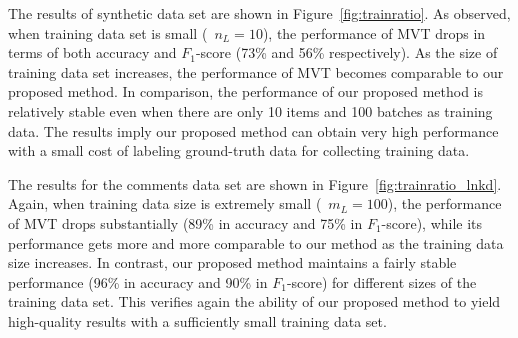 The results of synthetic data set are shown in Figure~\ref{fig:trainratio}.  
As observed, when training data set is small (\eg~$n_L=10$), 
the performance of MVT drops in terms of both accuracy and $F_1$-score (73\% and 56\% respectively).  
As the size of training data set increases, 
the performance of MVT becomes comparable to our proposed method.  
In comparison, the performance of our proposed method is relatively stable
even when there are only 10 items and 100 batches as training data.  
The results imply our proposed method can obtain very high performance 
with a small cost of labeling ground-truth data for collecting training data.  

The results for the comments data set are shown in Figure~\ref{fig:trainratio_lnkd}.  
Again, when training data size is extremely small (\eg~$m_L=100$), 
the performance of MVT drops substantially (89\% in accuracy and 75\% in $F_1$-score), 
while its performance gets more and more comparable to our method as the training data size increases.  
In contrast, our proposed method maintains a fairly stable 
performance (96\% in accuracy and 90\% in $F_1$-score) for different sizes of the training data set. 
This verifies again the ability of our proposed method to yield high-quality results 
with a sufficiently small training data set.  


%
